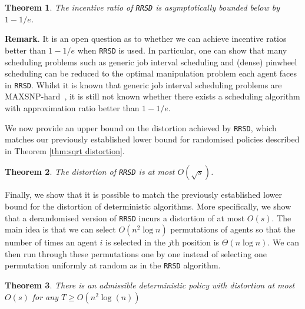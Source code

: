 \documentclass[letterpaper,11pt]{article}
\newtheorem{thm}{Theorem}
\begin{document}
\begin{thm}
\label{thm: incentive ratio of RRSD}
    The incentive ratio of \texttt{RRSD} is asymptotically bounded below by $1 - 1/e$.
\end{thm}


\noindent
\textbf{Remark}. It is an open question as to whether we can achieve incentive ratios better than $1- 1/e$ when \texttt{RRSD} is used. In particular, one can show that many scheduling problems such as generic job interval scheduling and (dense) pinwheel scheduling can be reduced to the optimal manipulation problem each agent faces in \texttt{RRSD}. Whilst it is known that generic job interval scheduling problems are MAXSNP-hard~\cite{chuzhoy2006approximation}, it is still not known whether there exists a scheduling algorithm with approximation ratio better than $1 - 1/e$. 

We now provide an upper bound on the distortion achieved by \texttt{RRSD}, which matches our previously established lower bound for randomised policies described in Theorem \ref{thm:sqrt distortion}.

\begin{thm}
\label{thm:distortion of RRSD}
    The distortion of \texttt{RRSD} is at most $O(\sqrt{s})$.
\end{thm}

Finally, we show that it is possible to match the previously established lower bound for the distortion of deterministic algorithms. More specifically, we show that a derandomised version of \texttt{RRSD} incurs a distortion of at most $O(s)$. The main idea is that we can select $O(n^{2}\log{n})$ permutations of agents so that the number of times an agent $i$ is selected in the $j$th position is $\Theta(n\log{n})$. We can then run through these permutations one by one instead of selecting one permutation uniformly at random as in the \texttt{RRSD} algorithm. 

\begin{thm}
    \label{thm:det-upper}
    There is an admissible deterministic policy with distortion at most $O(s)$ for any $T \geq O(n^{2}\log(n))$
\end{thm}
\end{document}
